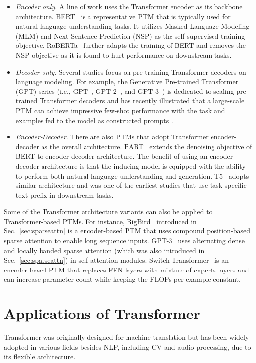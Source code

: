\documentclass[manuscript,acmsmall,screen,nonacm]{acmart}
\theoremstyle{definition}
\begin{document}
\begin{itemize}
    \item \textit{Encoder only}. A line of work uses the Transformer encoder as its backbone architecture. BERT~\cite{devlin2019bert} is a representative PTM that is typically used for natural language understanding tasks. It utilizes Masked Language Modeling (MLM) and Next Sentence Prediction (NSP) as the self-supervised training objective. RoBERTa~\cite{liu2019roberta} further adapts the training of BERT and removes the NSP objective as it is found to hurt performance on downstream tasks.
    \item \textit{Decoder only}. Several studies focus on pre-training Transformer decoders on language modeling. For example, the Generative Pre-trained Transformer (GPT) series (i.e., GPT~\cite{radford2018gpt}, GPT-2~\cite{radford2019gpt2}, and GPT-3~\cite{brown20gpt3}) is dedicated to scaling pre-trained Transformer decoders and has recently illustrated that a large-scale PTM can achieve impressive few-shot performance with the task and examples fed to the model as constructed prompts~\cite{brown20gpt3}.
    \item \textit{Encoder-Decoder}. There are also PTMs that adopt Transformer encoder-decoder as the overall architecture. BART~\cite{lewis20bart} extends the denoising objective of BERT to encoder-decoder architecture. The benefit of using an encoder-decoder architecture is that the inducing model is equipped with the ability to perform both natural language understanding and generation. T5~\cite{raffel2020t5} adopts similar architecture and was one of the earliest studies that use task-specific text prefix in downstream tasks.
\end{itemize}

Some of the Transformer architecture variants can also be applied to Transformer-based PTMs. For instance, BigBird~\cite{zaheer2020big} introduced in Sec.~\ref{sec:sparseattn} is a encoder-based PTM that uses compound position-based sparse attention to enable long sequence inputs. GPT-3~\cite{brown20gpt3} uses alternating dense and locally banded sparse attention (which was also introduced in Sec.~\ref{sec:sparseattn}) in self-attention modules. Switch Transformer~\cite{fedus2021switch} is an encoder-based PTM that replaces FFN layers with mixture-of-experts layers and can increase parameter count while keeping the FLOPs per example constant.

\section{Applications of Transformer}\label{sec:app}
Transformer was originally designed for machine translation but has been widely adopted in various fields besides NLP, including CV and audio processing, due to its flexible architecture.
\end{document}
